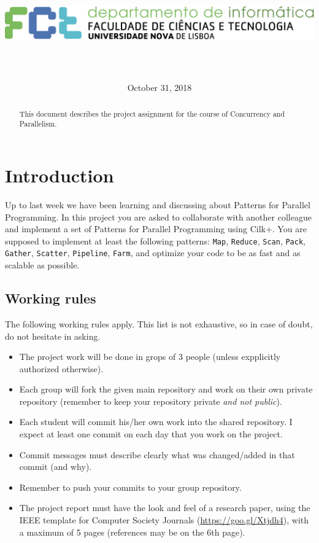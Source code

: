 \documentclass[11pt]{article}
\title{\vspace*{-5ex}\includegraphics[width=0.66\linewidth]{logoDIFCTUNL_horiz-transparente}\\{\LARGE\mycourse}\\{\Large\mytitle}}
\author{\myauthor}
\date{October 31, 2018}
\begin{document}
\maketitle


\begin{abstract}
    This document describes the project assignment for the course of Concurrency and Parallelism.
\end{abstract}

\section{Introduction}

Up to last week we have been learning and discussing about Patterns for Parallel Programming.  In this project you are asked to collaborate with another colleague and implement a set of Patterns for Parallel Programming using Cilk+.  You are supposed to implement at least the following patterns:     \verb!Map!, \verb!Reduce!, \verb!Scan!, \verb!Pack!, \verb!Gather!, \verb!Scatter!, \verb!Pipeline!, \verb!Farm!, and optimize your code to be as fast and as scalable as possible.  

\subsection{Working rules}

The following working rules apply.  This list is not exhaustive, so in case of doubt, do not hesitate in asking.
\begin{itemize}
  \item The project work will be done in grops of 3 people (unless expplicitly authorized otherwise).
  \item Each group will fork the given main repository and work on their own private repository (remember to keep your repository private \emph{and not public}).
  \item Each student will commit his/her own work into the shared repository.  I expect at least one commit on each day that you work on the project.
  \item Commit messages must describe clearly what was changed/added in that commit (and why).
  \item Remember to push your commits to your group repository. 
  \item The project report must have the look and feel of a research paper, using the IEEE template for Computer Society Journals (\url{https://goo.gl/Xtjdh4}), with a maximum of 5 pages (references may be on the 6th page).
\end{itemize}
\end{document}
